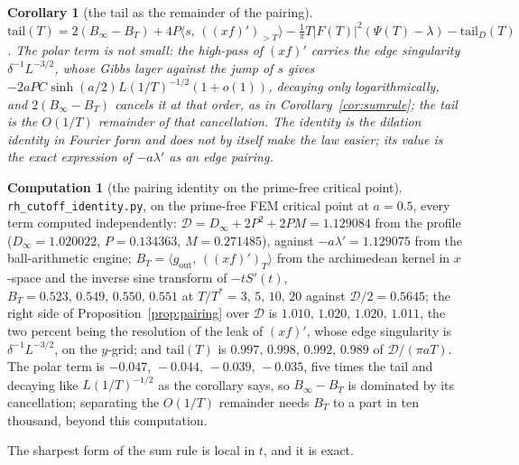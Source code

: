 \documentclass[11pt]{article}
\newtheorem{corollary}[theorem]{Corollary}
\theoremstyle{definition}
\newtheorem{computation}[theorem]{Computation}
\theoremstyle{remark}
\newcommand{\ip}[2]{\langle #1,\, #2\rangle}
\newcommand{\Tst}{T^{*}}
\begin{document}
\begin{corollary}[the tail as the remainder of the pairing]\label{cor:remainder}
$\mathrm{tail}(T)=2(B_\infty-B_T)+4P\ip{s}{((xf)')_{>T}}-\frac1\pi T|F(T)|^2(\Psi(T)-\lambda)-\mathrm{tail}_D(T)$. The polar term is not small: the high-pass of $(xf)'$ carries the edge singularity $\delta^{-1}L^{-3/2}$, whose Gibbs layer against the jump of $s$ gives $-2aPC\sinh(a/2)L(1/T)^{-1/2}(1+o(1))$, decaying only logarithmically, and $2(B_\infty-B_T)$ cancels it at that order, as in Corollary~\ref{cor:sumrule}; the tail is the $O(1/T)$ remainder of that cancellation. The identity is the dilation identity in Fourier form and does not by itself make the law easier; its value is the exact expression of $-a\lambda'$ as an edge pairing.
\end{corollary}

\begin{computation}[the pairing identity on the prime-free critical point]\label{comp:pairing}
\texttt{rh\_cutoff\_identity.py}, on the prime-free FEM critical point at $a=0.5$, every term computed independently: $\mathcal D=D_\infty+2P^2+2PM=1.129084$ from the profile ($D_\infty=1.020022$, $P=0.134363$, $M=0.271485$), against $-a\lambda'=1.129075$ from the ball-arithmetic engine; $B_T=\ip{g_{\mathrm{out}}}{((xf)')_T}$ from the archimedean kernel in $x$-space and the inverse sine transform of $-tS'(t)$, $B_T=0.523,\,0.549,\,0.550,\,0.551$ at $T/\Tst=3,\,5,\,10,\,20$ against $\mathcal D/2=0.5645$; the right side of Proposition~\ref{prop:pairing} over $\mathcal D$ is $1.010,\,1.020,\,1.020,\,1.011$, the two percent being the resolution of the leak of $(xf)'$, whose edge singularity is $\delta^{-1}L^{-3/2}$, on the $y$-grid; and $\mathrm{tail}(T)$ is $0.997,\,0.998,\,0.992,\,0.989$ of $\mathcal D/(\pi aT)$. The polar term is $-0.047,\,-0.044,\,-0.039,\,-0.035$, five times the tail and decaying like $L(1/T)^{-1/2}$ as the corollary says, so $B_\infty-B_T$ is dominated by its cancellation; separating the $O(1/T)$ remainder needs $B_T$ to a part in ten thousand, beyond this computation.
\end{computation}

The sharpest form of the sum rule is local in $t$, and it is exact.
\end{document}
